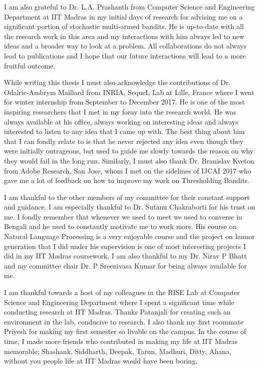 I am also grateful to Dr. L.A. Prashanth from Computer Science and Engineering Department at IIT Madras in my initial days of research for advising me on a significant portion of stochastic multi-armed bandits. He is up-to-date with all the research work in this area and my interactions with him always led to new ideas and a broader way to look at a problem. All collaborations do not always lead to publications and I hope that our future interactions will lead to a more fruitful outcome.

While writing this thesis I must also acknowledge the contributions of Dr. Odalric-Ambrym Maillard from INRIA, SequeL Lab at Lille, France where I went for winter internship from September to December 2017. He is one of the most inspiring researchers that I met in my foray into the research world. He was always available at his office, always working on interesting ideas and always interested to listen to any idea that I came up with. The best thing about him that I can fondly relate to is that he never rejected any idea even though they were initially outrageous, but used to guide me slowly towards the reason on why they would fail in the long run. Similarly, I must also thank Dr. Branislav Kveton from Adobe Research, San Jose, whom I met on the sidelines of IJCAI 2017 who gave me a lot of feedback on how to improve my work on Thresholding Bandits. 

I am thankful to the other members of my committee for their constant support and guidance. I am especially thankful to Dr.  Sutanu Chakraborti for his trust on me. I fondly remember that whenever we used to meet we used to converse in Bengali and he used to constantly motivate me to work more. His course on Natural Language Processing is a very enjoyable course and the project on humor generation that I did under his supervision is one of most interesting projects I did in my IIT Madras coursework. I am also thankful to my Dr. Nirav P Bhatt and my committee chair Dr. P Sreenivasa Kumar for being always available for me.


I am thankful towards a host of my colleagues in the RISE Lab at Computer Science and Engineering Department where I spent a significant time while conducting research at IIT Madras. Thanks Patanjali for creating such an environment in the lab, conducive to research. I also thank my first roommate Priyesh for making my first semester so livable on the campus. In the course of time, I made more friends who contributed in making my life at IIT Madras memorable; Shashank, Siddharth, Deepak, Tarun, Madhuri, Ditty, Ahana, without you people life at IIT Madras would have been boring.

